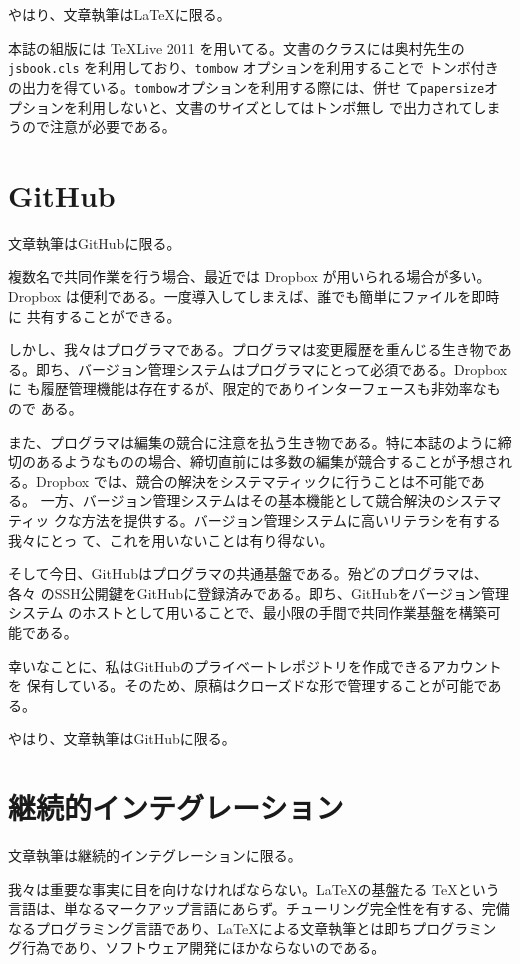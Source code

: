 やはり、文章執筆はLaTeXに限る。

本誌の組版には \TeX Live 2011 を用いてる。文書のクラスには奥村先生の
{\tt jsbook.cls} を利用しており、{\tt tombow} オプションを利用することで
トンボ付きの出力を得ている。{\tt tombow}オプションを利用する際には、併せ
て{\tt papersize}オプションを利用しないと、文書のサイズとしてはトンボ無し
で出力されてしまうので注意が必要である。

\section{GitHub}

文章執筆はGitHubに限る。

複数名で共同作業を行う場合、最近では Dropbox が用いられる場合が多い。
Dropbox は便利である。一度導入してしまえば、誰でも簡単にファイルを即時に
共有することができる。

しかし、我々はプログラマである。プログラマは変更履歴を重んじる生き物であ
る。即ち、バージョン管理システムはプログラマにとって必須である。Dropboxに
も履歴管理機能は存在するが、限定的でありインターフェースも非効率なもので
ある。

また、プログラマは編集の競合に注意を払う生き物である。特に本誌のように締
切のあるようなものの場合、締切直前には多数の編集が競合することが予想され
る。Dropbox では、競合の解決をシステマティックに行うことは不可能である。
一方、バージョン管理システムはその基本機能として競合解決のシステマティッ
クな方法を提供する。バージョン管理システムに高いリテラシを有する我々にとっ
て、これを用いないことは有り得ない。

そして今日、GitHubはプログラマの共通基盤である。殆どのプログラマは、各々
のSSH公開鍵をGitHubに登録済みである。即ち、GitHubをバージョン管理システム
のホストとして用いることで、最小限の手間で共同作業基盤を構築可能である。

幸いなことに、私はGitHubのプライベートレポジトリを作成できるアカウントを
保有している。そのため、原稿はクローズドな形で管理することが可能である。

やはり、文章執筆はGitHubに限る。

\section{継続的インテグレーション}

文章執筆は継続的インテグレーションに限る。

我々は重要な事実に目を向けなければならない。\LaTeX の基盤たる \TeX という
言語は、単なるマークアップ言語にあらず。チューリング完全性を有する、完備
なるプログラミング言語であり、\LaTeX による文章執筆とは即ちプログラミン
グ行為であり、ソフトウェア開発にほかならないのである。

